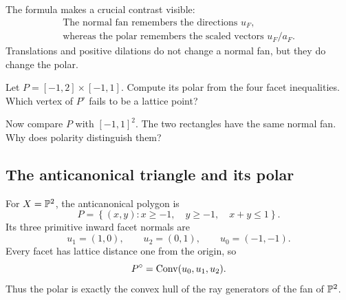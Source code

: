 The formula makes a crucial contrast visible:
\[
\boxed{
\begin{array}{c}
\text{The normal fan remembers the directions }u_F,\\[1mm]
\text{whereas the polar remembers the scaled vectors }u_F/a_F.
\end{array}
}
\]
Translations and positive dilations do not change a normal fan, but
they do change the polar.

\begin{pauseandthink}
Let \(P=[-1,2]\times[-1,1]\). Compute its polar from the four facet
inequalities. Which vertex of \(P^\circ\) fails to be a lattice point?

Now compare \(P\) with \([-1,1]^2\). The two rectangles have the same
normal fan. Why does polarity distinguish them?
\end{pauseandthink}

\subsection{The anticanonical triangle and its polar}

For \(X=\mathbb{P}^2\), the anticanonical polygon is
\[
P=
\left\{
(x,y):x\geq-1,\quad y\geq-1,\quad x+y\leq1
\right\}.
\]
Its three primitive inward facet normals are
\[
u_1=(1,0),
\qquad
u_2=(0,1),
\qquad
u_0=(-1,-1).
\]
Every facet has lattice distance one from the origin, so
\[
P^\circ
=
\operatorname{Conv}(u_0,u_1,u_2).
\]
Thus the polar is exactly the convex hull of the ray generators of the
fan of \(\mathbb{P}^2\).

